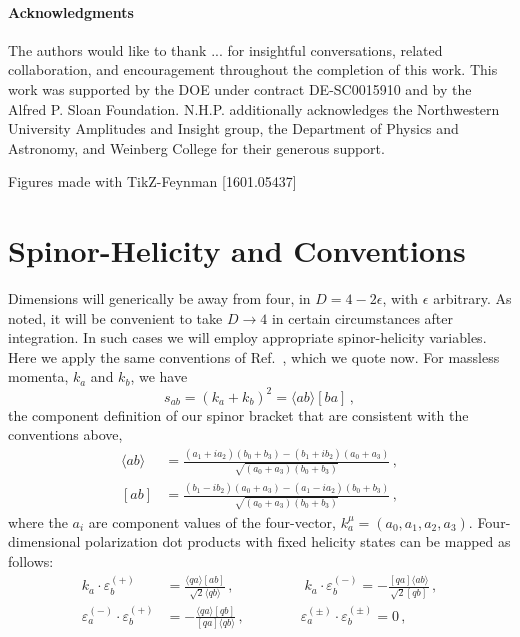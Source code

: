 \documentclass[11pt,letter]{article}
\begin{document}
\paragraph{Acknowledgments} The authors would like to thank ... for insightful conversations, related collaboration, and encouragement throughout the completion of this work. This work was supported by the DOE under contract DE-SC0015910 and by the Alfred P. Sloan Foundation. N.H.P. additionally acknowledges the Northwestern University Amplitudes and Insight group, the Department of Physics and Astronomy, and Weinberg College for their generous support. 

Figures made with TikZ-Feynman [1601.05437]

\appendix
\section{Spinor-Helicity and Conventions}
Dimensions will generically be away from four, in $D=4-2\epsilon$, with $\epsilon$ arbitrary. As noted, it will be convenient to take $D\rightarrow 4$ in certain circumstances after integration.  In such cases we will employ appropriate spinor-helicity variables.  Here we apply the same conventions of Ref.~\cite{jjmcTASI2014}, which we quote now. For massless momenta, $k_a$ and $k_b$, we have 
\begin{equation}
s_{ab} = (k_a+k_b)^2= \langle ab \rangle[ba]\,,
\end{equation}
the component definition of our spinor bracket that are consistent with the conventions above,
\begin{align}
\langle ab \rangle &= \frac{(a_1 + i a_2)(b_0+b_3)-(b_1 + i b_2)(a_0+a_3)}{\sqrt{(a_0+a_3)(b_0+b_3)}}\,,
\\
[ab] &= \frac{(b_1 - i b_2)(a_0+a_3)-(a_1 - i a_2)(b_0+b_3)}{\sqrt{(a_0+a_3)(b_0+b_3)}}\,,
\end{align}
where the $a_i$ are component values of the four-vector, $k^\mu_a = (a_0,a_1,a_2,a_3)$. Four-dimensional polarization dot products with fixed helicity states can be mapped as follows:
\begin{equation}\label{eq:4DPols}
\begin{aligned}
k_a \cdot \varepsilon_b^{(+)} &= \frac{\langle q a \rangle[ab]}{\sqrt{2}\langle q b\rangle}\,,
\qquad\quad \qquad
k_a \cdot \varepsilon_b^{(-)} = -\frac{[qa]\langle ab\rangle}{\sqrt{2}[qb]}\,,
\\
\varepsilon_a^{(-)}\cdot \varepsilon_b^{(+)} &= - \frac{\langle q a\rangle [qb]}{ [qa]\langle q b\rangle} \,,
\qquad \qquad
\varepsilon_a^{(\pm)}\cdot \varepsilon_b^{(\pm)} = 0 \,,
\end{aligned}
\end{equation}
\end{document}
